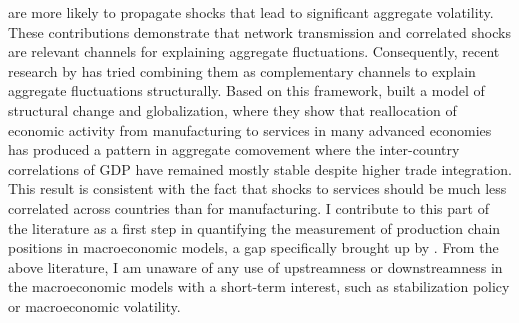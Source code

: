 are more likely to propagate shocks that lead to significant aggregate volatility. These contributions demonstrate that network 
transmission and correlated shocks are relevant channels for explaining aggregate fluctuations. Consequently, recent research by 
\textcite{huo2019InternationalComovementGlobal} has tried combining them as complementary channels to explain aggregate fluctuations 
structurally. Based on this framework, \textcite{bonadio2023GlobalizationStructuralChange} built a model of structural change and 
globalization, where they show that reallocation of economic activity from manufacturing to services in many advanced economies has 
produced a pattern in aggregate comovement where the inter-country correlations of GDP have remained mostly stable despite higher 
trade integration. This result is consistent with the fact that shocks to services should be much less correlated across countries than for 
manufacturing. I contribute to this part of the literature as a first step in quantifying the measurement of production chain positions in 
macroeconomic models, a gap specifically brought up by \textcite[27]{smets2019PipelinePressuresSectoral}. From the above literature, 
I am unaware of any use of upstreamness or downstreamness in the macroeconomic models with a short-term interest, such as stabilization 
policy or macroeconomic volatility.\\

